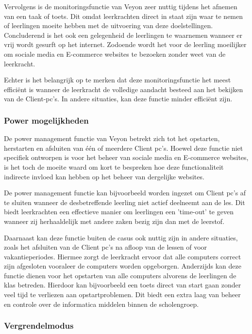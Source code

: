 Vervolgens is de monitoringsfunctie van Veyon zeer nuttig tijdens het afnemen van een taak of toets. Dit omdat leerkrachten direct in staat zijn waar te nemen of leerlingen moeite hebben met de uitvoering van deze doelstellingen. Concluderend is het ook een gelegenheid de leerlingen te waarnemen wanneer er vrij wordt gesurft op het internet. Zodoende wordt het voor de leerling moeilijker om sociale media en E-commerce websites te bezoeken zonder weet van de leerkracht. 

Echter is het belangrijk op te merken dat deze monitoringsfunctie het meest efficiënt is wanneer de leerkracht de volledige aandacht besteed aan het bekijken van de Client-pc's. In andere situaties, kan deze functie minder efficiënt zijn.  

\subsubsection{Power mogelijkheden}
De power management functie van Veyon betrekt zich tot het opstarten, herstarten en afsluiten van één of meerdere Client pc's. Hoewel deze functie niet specifiek ontworpen is voor het beheer van sociale media en E-commerce websites, is het toch de moeite waard om kort te bespreken hoe deze functionaliteit indirecte invloed kan hebben op het beheer van dergelijke websites.

De power management functie kan bijvoorbeeld worden ingezet om Client pc's af te sluiten wanneer de desbetreffende leerling niet actief deelneemt aan de les. Dit biedt leerkrachten een effectieve manier om leerlingen een 'time-out' te geven wanneer zij herhaaldelijk met andere zaken bezig zijn dan met de leerstof. 

Daarnaast kan deze functie buiten de casus ook nuttig zijn in andere situaties, zoals het afsluiten van de Client pc's na afloop van de lessen of voor vakantieperiodes. Hiermee zorgt de leerkracht ervoor dat alle computers correct zijn afgesloten vooraleer de computers worden opgeborgen. Anderzijds kan deze functie dienen voor het opstarten van alle computers alvorens de leerlingen de klas betreden. Hierdoor kan bijvoorbeeld een toets direct van start gaan zonder veel tijd te verliezen aan opstartproblemen. Dit biedt een extra laag van beheer en controle over de informatica middelen binnen de scholengroep.
\subsubsection{Vergrendelmodus}

